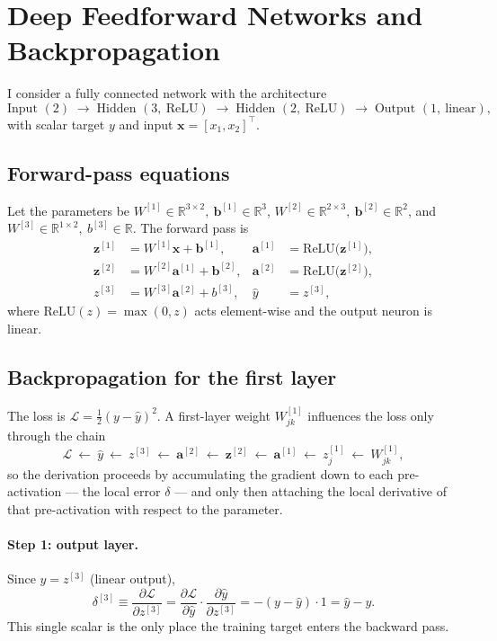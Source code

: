 \documentclass[11pt,a4paper]{article}
\begin{document}
\tableofcontents
\newpage

\section{Deep Feedforward Networks and Backpropagation}

I consider a fully connected network with the architecture
\[
\text{Input }(2)\;\to\;\text{Hidden }(3,\ \mathrm{ReLU})\;\to\;
\text{Hidden }(2,\ \mathrm{ReLU})\;\to\;\text{Output }(1,\ \text{linear}),
\]
with scalar target $y$ and input $\mathbf{x}=[x_1,x_2]^\top$.

\subsection{Forward-pass equations}
Let the parameters be
$W^{[1]}\in\mathbb{R}^{3\times2},\ \mathbf{b}^{[1]}\in\mathbb{R}^{3}$,
$W^{[2]}\in\mathbb{R}^{2\times3},\ \mathbf{b}^{[2]}\in\mathbb{R}^{2}$, and
$W^{[3]}\in\mathbb{R}^{1\times2},\ b^{[3]}\in\mathbb{R}$. The forward pass is
\begin{align}
\mathbf{z}^{[1]} &= W^{[1]}\mathbf{x}+\mathbf{b}^{[1]}, &
\mathbf{a}^{[1]} &= \mathrm{ReLU}\!\big(\mathbf{z}^{[1]}\big),\\
\mathbf{z}^{[2]} &= W^{[2]}\mathbf{a}^{[1]}+\mathbf{b}^{[2]}, &
\mathbf{a}^{[2]} &= \mathrm{ReLU}\!\big(\mathbf{z}^{[2]}\big),\\
z^{[3]} &= W^{[3]}\mathbf{a}^{[2]}+b^{[3]}, &
\hat{y} &= z^{[3]},
\end{align}
where $\mathrm{ReLU}(z)=\max(0,z)$ acts element-wise and the output neuron is linear.

\subsection{Backpropagation for the first layer}
The loss is $\mathcal{L}=\tfrac12(y-\hat{y})^2$. A first-layer weight $W^{[1]}_{jk}$
influences the loss only through the chain
\[
\mathcal{L}\ \leftarrow\ \hat{y}\ \leftarrow\ z^{[3]}\ \leftarrow\ \mathbf{a}^{[2]}
\ \leftarrow\ \mathbf{z}^{[2]}\ \leftarrow\ \mathbf{a}^{[1]}\ \leftarrow\ z^{[1]}_j
\ \leftarrow\ W^{[1]}_{jk},
\]
so the derivation proceeds by accumulating the gradient down to each pre-activation
--- the local error $\delta$ --- and only then attaching the local derivative of that
pre-activation with respect to the parameter.

\paragraph{Step 1: output layer.} Since $\hat{y}=z^{[3]}$ (linear output),
\begin{equation}
\delta^{[3]}\equiv\frac{\partial\mathcal{L}}{\partial z^{[3]}}
=\frac{\partial\mathcal{L}}{\partial\hat y}\cdot\frac{\partial\hat y}{\partial z^{[3]}}
=-(y-\hat{y})\cdot 1=\hat{y}-y .
\end{equation}
This single scalar is the only place the training target enters the backward pass.
\end{document}
